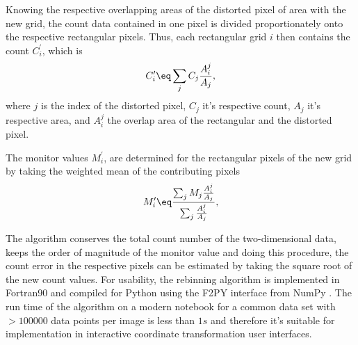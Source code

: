 \documentclass[\main/dresen_thesis.tex]{subfiles}
\begin{document}
  Knowing the respective overlapping areas  of the distorted pixel of area  with the new grid, the count data contained in one pixel is divided proportionately onto the respective rectangular pixels.
  Thus, each rectangular grid $i$ then contains the count $C^\prime_i$, which is
  \begin{align}
    C^\prime_i \eq \sum_{j} C_j \frac{A_i^j}{A_j},
  \end{align}
  where $j$ is the index of the distorted pixel, $C_j$ it's respective count, $A_j$ it's respective area, and $A_i^j$ the overlap area of the rectangular and the distorted pixel.

  The monitor values $M^\prime_i$, are determined for the rectangular pixels of the new grid by taking the weighted mean of the contributing pixels
  \begin{align}
    M^\prime_i \eq \frac{\sum_{j} M_j \frac{A_i^j}{A_j}}{\sum_{j} \frac{A_i^j}{A_j}},
  \end{align}

  The algorithm conserves the total count number of the two-dimensional data, keeps the order of magnitude of the monitor value and doing this procedure, the count error in the respective pixels can be estimated by taking the square root of the new count values.
  For usability, the rebinning algorithm is implemented in Fortran90 and compiled for Python using the F2PY interface from NumPy \cite{Oliphant_2006_Guide}.
  The run time of the algorithm on a modern notebook for a common data set with $> 100000$ data points per image is less than $1 \unit{s}$ and therefore it's suitable for implementation in interactive coordinate transformation user interfaces.
\end{document}
